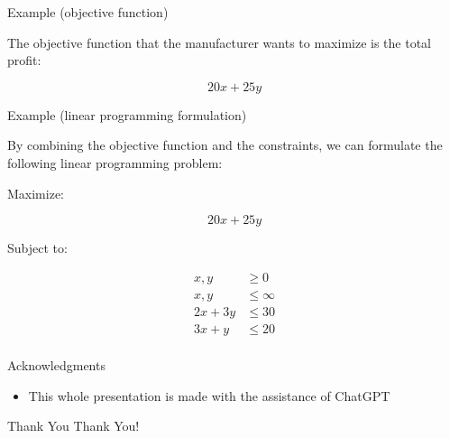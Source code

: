 \documentclass{beamer}
\begin{document}
\begin{frame}{Example (objective function)}

    The objective function that the manufacturer wants to maximize is the total profit:

    \begin{equation}
        20x + 25y
    \end{equation}

\end{frame}

\begin{frame}{Example (linear programming formulation)}

    By combining the objective function and the constraints, we can formulate the following linear programming problem:

    Maximize:

    \begin{equation}
        20x + 25y
    \end{equation}

    Subject to:

    \begin{align}
        x, y &\geq 0 \\
        x, y &\leq \infty \\
        2x + 3y &\leq 30 \\
        3x + y &\leq 20 \\
    \end{align}

\end{frame}

\begin{frame}{Acknowledgments}
    \begin{itemize}
        \item This whole presentation is made with the assistance of ChatGPT
    \end{itemize}
\end{frame}

\begin{frame}{Thank You}
    \centering
    \Huge Thank You!
\end{frame}
\end{document}
